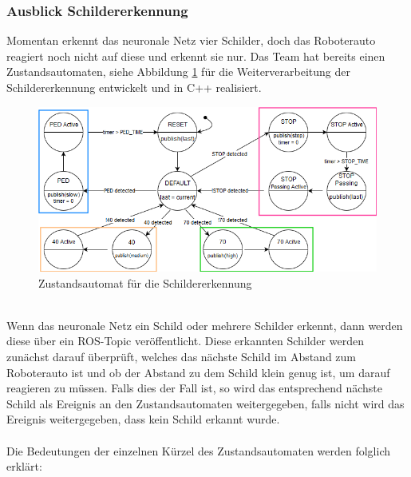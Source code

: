 \subsubsection{Ausblick Schildererkennung}
Momentan erkennt das neuronale Netz vier Schilder, doch das Roboterauto reagiert noch nicht auf diese und erkennt sie nur. Das Team hat bereits einen Zustandsautomaten, siehe Abbildung \ref{fig:zustandsautomat} f\"ur die Weiterverarbeitung der Schildererkennung entwickelt und in C++ realisiert.
\begin{figure}[h]
	\centering
	\includegraphics[width = 1\textwidth]{images/StateMachine.png}
	\caption{Zustandsautomat f\"ur die Schildererkennung}
	\label{fig:zustandsautomat}
\end{figure}
\\
Wenn das neuronale Netz ein Schild oder mehrere Schilder erkennt, dann werden diese \"uber ein ROS-Topic ver\"offentlicht. Diese erkannten Schilder werden zun\"achst darauf \"uberpr\"uft, welches das n\"achste Schild im Abstand zum Roboterauto ist und ob der Abstand zu dem Schild klein genug ist, um darauf reagieren zu m\"ussen. Falls dies der Fall ist, so wird das entsprechend n\"achste Schild als Ereignis an den Zustandsautomaten weitergegeben, falls nicht wird das Ereignis weitergegeben, dass kein Schild erkannt wurde.
\\\\Die Bedeutungen der einzelnen K\"urzel des Zustandsautomaten werden folglich erkl\"art:
